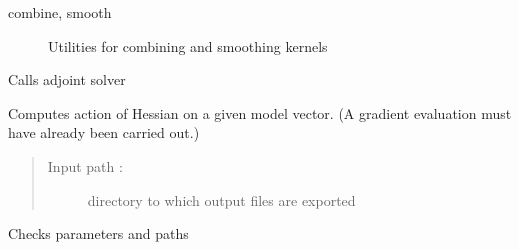 \documentclass[letterpaper,10pt,english]{sphinxmanual}
\begin{document}
\begin{fulllineitems}
\begin{description}
\begin{description}
\item[{combine, smooth}] \leavevmode
Utilities for combining and smoothing kernels

\end{description}

\end{description}

\begin{fulllineitems}
\label{\detokenize{ref/seisflows.solver:seisflows.solver.base.base.adjoint}}
Calls adjoint solver

\end{fulllineitems}


\begin{fulllineitems}
\label{\detokenize{ref/seisflows.solver:seisflows.solver.base.base.apply_hess}}
Computes action of Hessian on a given model vector.
(A gradient evaluation must have already been carried out.)
\begin{quote}\begin{description}
\item[{Input path :}] \leavevmode
directory to which output files are exported

\end{description}\end{quote}

\end{fulllineitems}


\begin{fulllineitems}
\label{\detokenize{ref/seisflows.solver:seisflows.solver.base.base.check}}
Checks parameters and paths

\end{fulllineitems}



\end{fulllineitems}
\end{document}
